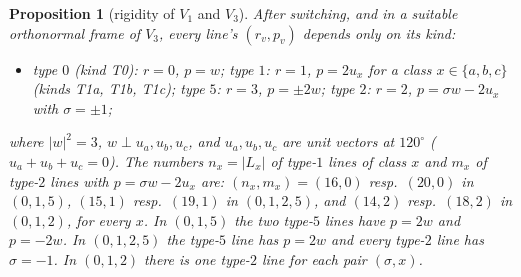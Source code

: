 \documentclass[11pt]{article}
\newtheorem{proposition}[theorem]{Proposition}
\theoremstyle{definition}
\begin{document}
\begin{proposition}[rigidity of $V_1$ and $V_3$]\label{prop:rigid}
After switching, and in a suitable orthonormal frame of $V_3$, every line's $(r_v,p_v)$ depends only on
its \emph{kind}:
\begin{itemize}
\item type $0$ (kind T0): $r=0$, $p=w$; type $1$: $r=1$, $p=2u_x$ for a class $x\in\{a,b,c\}$ (kinds
T1a, T1b, T1c); type $5$: $r=3$, $p=\pm2w$; type $2$: $r=2$, $p=\sigma w-2u_x$ with $\sigma=\pm1$;
\end{itemize}
where $|w|^2=3$, $w\perp u_a,u_b,u_c$, and $u_a,u_b,u_c$ are unit vectors at $120^\circ$
($u_a+u_b+u_c=0$). The numbers $n_x=|L_x|$ of type-$1$ lines of class $x$ and $m_x$ of type-$2$ lines
with $p=\sigma w-2u_x$ are: $(n_x,m_x)=(16,0)$ resp.\ $(20,0)$ in $(0,1,5)$, $(15,1)$ resp.\ $(19,1)$ in
$(0,1,2,5)$, and $(14,2)$ resp.\ $(18,2)$ in $(0,1,2)$, for every $x$. In $(0,1,5)$ the two type-$5$
lines have $p=2w$ and $p=-2w$. In $(0,1,2,5)$ the type-$5$ line has $p=2w$ and every type-$2$ line has
$\sigma=-1$. In $(0,1,2)$ there is one type-$2$ line for each pair $(\sigma,x)$.
\end{proposition}
\end{document}
